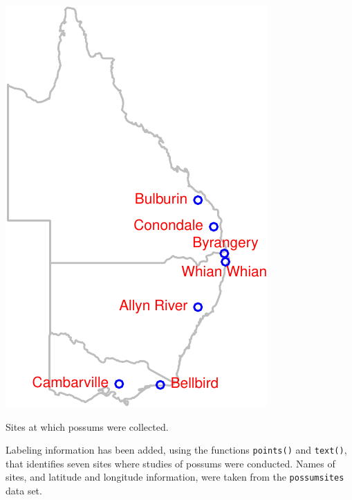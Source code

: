 \documentclass{tufte-book}\usepackage[]{graphicx}\usepackage[]{color}
\newcommand{\txtt}[1]{\texttt{#1}}
\begin{document}
\begin{marginfigure}
\begin{Schunk}


\centerline{\includegraphics[width=\textwidth]{figs/10-oz-sites-1} }

\end{Schunk}
\vspace*{3pt}

\caption{Sites at which possums were collected.\label{fig:possumsites}}
\end{marginfigure}

Labeling information has been added, using the functions
\txtt{points()} and \txtt{text()}, that identifies seven sites where
studies of possums were conducted.  Names of sites, and latitude and
longitude information, were taken from the \txtt{possumsites} data
set.
\end{document}
